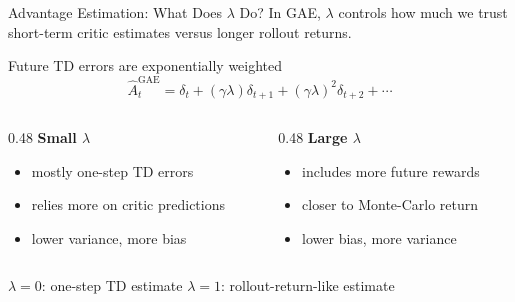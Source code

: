 \documentclass[aspectratio=169, 11pt]{beamer}
\begin{document}
\begin{frame}{Advantage Estimation: What Does $\lambda$ Do?}
  In GAE, $\lambda$ controls how much we trust short-term critic estimates
  versus longer rollout returns.

  \vspace{0.5em}
  \begin{block}{Future TD errors are exponentially weighted}
    \[
      \hat{A}_t^{\mathrm{GAE}}
      = \delta_t
        + (\gamma\lambda)\delta_{t+1}
        + (\gamma\lambda)^2\delta_{t+2}
        + \cdots
    \]
  \end{block}

  \begin{columns}[T]
    \begin{column}{0.48\textwidth}
      \textbf{Small $\lambda$}\\[0.2em]
      \begin{itemize}
        \item mostly one-step TD errors
        \item relies more on critic predictions
        \item lower variance, more bias
      \end{itemize}
    \end{column}
    \begin{column}{0.48\textwidth}
      \textbf{Large $\lambda$}\\[0.2em]
      \begin{itemize}
        \item includes more future rewards
        \item closer to Monte-Carlo return
        \item lower bias, more variance
      \end{itemize}
    \end{column}
  \end{columns}

  \vspace{0.3em}
  \centering
  \small $\lambda=0$: one-step TD estimate \qquad $\lambda=1$: rollout-return-like estimate
\end{frame}
\end{document}
